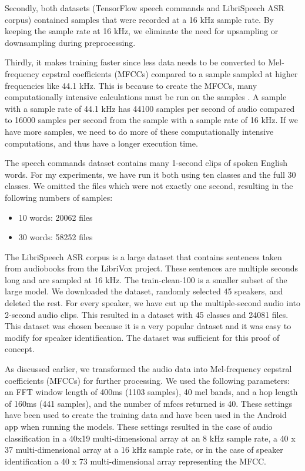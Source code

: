 \documentclass{report}
\theoremstyle{definition}
\theoremstyle{remark}
\begin{document}
Secondly, both datasets (TensorFlow speech commands and LibriSpeech ASR corpus) contained samples that were recorded at a 16 kHz sample rate. By keeping the sample rate at 16 kHz, we eliminate the need for upsampling or downsampling during preprocessing. 

Thirdly, it makes training faster since less data needs to be converted to Mel-frequency cepstral coefficients (MFCCs) compared to a sample sampled at higher frequencies like 44.1 kHz. This is because to create the MFCCs, many computationally intensive calculations must be run on the samples \cite{1692543}. A sample with a sample rate of 44.1 kHz has 44100 samples per second of audio compared to 16000 samples per second from the sample with a sample rate of 16 kHz. If we have more samples, we need to do more of these computationally intensive computations, and thus have a longer execution time. 

The speech commands dataset contains many 1-second clips of spoken English words. For my experiments, we have run it both using ten classes and the full 30 classes. We omitted the files which were not exactly one second, resulting in the following numbers of samples:

\begin{itemize}
    \item 10 words: 20062 files
    \item 30 words: 58252 files
\end{itemize}


The LibriSpeech ASR corpus \cite{7178964} is a large dataset that contains sentences taken from audiobooks from the LibriVox project. These sentences are multiple seconds long and are sampled at 16 kHz. The train-clean-100 is a smaller subset of the large model. We downloaded the dataset, randomly selected 45 speakers, and deleted the rest. For every speaker, we have cut up the multiple-second audio into 2-second audio clips. This resulted in a dataset with 45 classes and 24081 files. This dataset was chosen because it is a very popular dataset and it was easy to modify for speaker identification. The dataset was sufficient for this proof of concept.

As discussed earlier, we transformed the audio data into Mel-frequency cepstral coefficients (MFCCs) for further processing. We used the following parameters: an FFT window length of  400ms (1103 samples), 40 mel bands, and a hop length of 160ms (441 samples), and the number of mfccs returned is 40. These settings have been used to create the training data and have been used in the Android app when running the models. These settings resulted in the case of audio classification in a 40x19 multi-dimensional array at an 8 kHz sample rate, a 40 x 37 multi-dimensional array at a 16 kHz sample rate, or in the case of speaker identification a 40 x 73 multi-dimensional array representing the MFCC.
\end{document}
